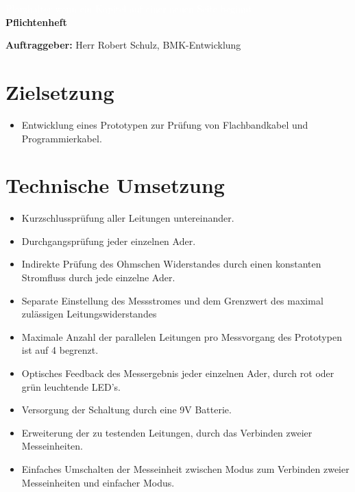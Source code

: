 \documentclass[a4paper,11pt]{scrartcl}
\begin{document}
\begin{center}
	\begin{huge}
	\textcolor{white}{\tiny{Platzhalter wenn ein Kapitel auf einer neuen Seite beginnt\\}}
	\textbf{Pflichtenheft}
	\end{huge}
\end{center}


\textbf{Auftraggeber:}
Herr Robert Schulz, BMK-Entwicklung

\section{Zielsetzung}

\begin{itemize}
	\item{Entwicklung eines Prototypen zur Prüfung von Flachbandkabel und Programmierkabel.}
\end{itemize}

\section{Technische Umsetzung}

\begin{itemize}
	\item{Kurzschlussprüfung aller Leitungen untereinander.}
	
	\item{Durchgangsprüfung jeder einzelnen Ader.}
	
	\item{Indirekte Prüfung des Ohmschen Widerstandes durch einen konstanten Stromfluss durch jede einzelne Ader.}
	
	\item{Separate Einstellung des Messstromes und dem Grenzwert des maximal zulässigen Leitungswiderstandes}
	
	\item{Maximale Anzahl der parallelen Leitungen pro Messvorgang des Prototypen ist auf 4 begrenzt.}
	
	\item{Optisches Feedback des Messergebnis jeder einzelnen Ader, durch rot oder grün leuchtende LED's.}
	
	\item{Versorgung der Schaltung durch eine 9V Batterie.}
	
	\item{Erweiterung der zu testenden Leitungen, durch das Verbinden zweier Messeinheiten.}
	
	\item{Einfaches Umschalten der Messeinheit zwischen Modus zum Verbinden zweier Messeinheiten und einfacher Modus.}
\end{itemize}
\end{document}
